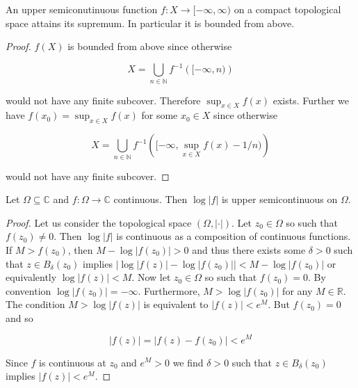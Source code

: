 \begin{lemma*}
	An upper semiconutinuous function $f: X \to [-\infty,\infty)$ on a compact topological space attains its supremum. In particular it is bounded from above.
		\label{lem:semicom}
\end{lemma*}

\begin{proof}
	 $f(X)$ is bounded from above since otherwise

	\begin{equation*}
		X = \bigcup_{n \in \mathbb{N}} f^{-1}\left( [-\infty,n)\right)
	\end{equation*}

	\noindent would not have any finite subcover. Therefore $\sup_{x \in X}f(x)$ exists. Further we have $f(x_0) = \sup_{x \in X}f(x)$ for some $x_0 \in X$ since otherwise

	\begin{equation*}
		X = \bigcup_{n \in \mathbb{N}} \textstyle f^{-1}\left( [-\infty,\sup_{x \in X}f(x) - 1/n)\right)
	\end{equation*}

	\noindent would not have any finite subcover.	
\end{proof}

\begin{lemma}
	Let $\Omega \subseteq \mathbb{C}$ and $f: \Omega \to \mathbb{C}$ continuous. Then $\log\left| f\right|$ is upper semicontinuous on $\Omega$.
	\label{lem:uppersemcont}
\end{lemma}

\begin{proof}
	Let us consider the topological space $\left( \Omega, \left| \cdot\right| \right)$. Let $z_0 \in \Omega$ so such that $f(z_0) \neq 0$. Then $\log\left| f\right|$ is continuous as a composition of continuous functions. If $M > f(z_0)$, then $M - \log\left| f(z_0)\right| > 0$ and thus there exists some $\delta > 0$ such that $z \in B_\delta(z_0)$ implies $\left| \log\left| f(z)\right| - \log\left| f(z_0)\right|\right| < M- \log\left| f(z_0)\right|$ or equivalently $\log\left| f(z)\right| < M$. Now let $z_0 \in \Omega$ so such that $f(z_0) = 0$. By convention $\log\left| f(z_0)\right| = -\infty$. Furthermore, $M > \log\left| f(z_0)\right|$ for any $M \in \mathbb{R}$. The condition $M > \log\left| f(z)\right|$ is equivalent to $\left| f(z)\right| < e^M$. But $f(z_0) = 0$ and so

	\begin{equation*}
		\left| f(z)\right| = \left| f(z) - f(z_0)\right|< e^M
	\end{equation*}

	Since $f$ is continuous at $z_0$ and $e^M > 0$ we find $\delta > 0$ such that $z \in B_\delta(z_0)$ implies $\left| f(z)\right| < e^M$.
\end{proof}

